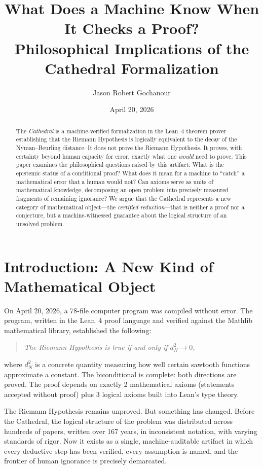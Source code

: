 \documentclass[11pt,a4paper]{article}
\title{%
  What Does a Machine Know When It Checks a Proof?\\[0.3cm]
  {\large Philosophical Implications of the Cathedral Formalization}%
}
\author{
  Jason Robert Gochanour
}
\date{April 20, 2026}
\begin{document}
\maketitle

\begin{abstract}
The \emph{Cathedral} is a machine-verified formalization in the Lean~4
theorem prover establishing that the Riemann Hypothesis is logically
equivalent to the decay of the Nyman--Beurling distance. It does not
prove the Riemann Hypothesis. It proves, with certainty beyond human
capacity for error, exactly what one \emph{would} need to prove.
This paper examines the philosophical questions raised by this
artifact: What is the epistemic status of a conditional proof? What
does it mean for a machine to ``catch'' a mathematical error that a
human would not? Can axioms serve as units of mathematical knowledge,
decomposing an open problem into precisely measured fragments of
remaining ignorance? We argue that the Cathedral represents a new
category of mathematical object---the \emph{certified reduction}---that
is neither a proof nor a conjecture, but a machine-witnessed
guarantee about the logical structure of an unsolved problem.
\end{abstract}

\tableofcontents

\section{Introduction: A New Kind of Mathematical Object}

On April 20, 2026, a 78-file computer program was compiled without
error. The program, written in the Lean~4 proof language and verified
against the Mathlib mathematical library, established the following:

\begin{quote}
\emph{The Riemann Hypothesis is true if and only if $d_N^2 \to 0$,}
\end{quote}

\noindent where $d_N^2$ is a concrete quantity measuring how well
certain sawtooth functions approximate a constant. The biconditional
is complete: both directions are proved. The proof depends on exactly
2 mathematical axioms (statements accepted without proof) plus 3
logical axioms built into Lean's type theory.

The Riemann Hypothesis remains unproved. But something has changed.
Before the Cathedral, the logical structure of the problem was
distributed across hundreds of papers, written over 167 years, in
inconsistent notation, with varying standards of rigor. Now it exists
as a single, machine-auditable artifact in which every deductive
step has been verified, every assumption is named, and the frontier
of human ignorance is precisely demarcated.
\end{document}

